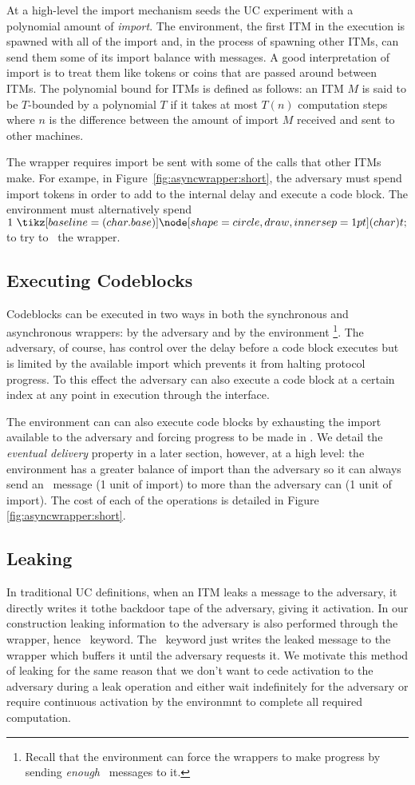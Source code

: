 At a high-level the import mechanism seeds the UC experiment with a polynomial amount of \textit{import}.
The environment, the first ITM in the execution is spawned with all of the import and, in the process of spawning other ITMs, can send them some of its import balance with messages.
A good interpretation of import is to treat them like tokens or coins that are passed around between ITMs.
The polynomial bound for ITMs is defined as follows: an ITM $M$ is said to be $T$-bounded by a polynomial $T$ if it takes at most $T(n)$ computation steps where $n$ is the difference between the amount of import $M$ received and sent to other machines.

The wrapper requires import be sent with some of the calls that other ITMs make. 
For exampe, in Figure~\ref{fig:asyncwrapper:short}, the adversary must spend import tokens in order to add to the internal delay and execute a code block.
The environment must alternatively spend $1 \token$ to try to \Advance~the wrapper.

\subsection{Executing Codeblocks}
Codeblocks can be executed in two ways in both the synchronous and asynchronous wrappers: by the adversary and by the environment \footnote{Recall that the environment can force the wrappers to make progress by sending {\em enough} \Advance~messages to it.}.
The adversary, of course, has control over the delay before a code block executes but is limited by the available import which prevents it from halting protocol progress.
To this effect the adversary can also execute a code block at a certain index at any point in execution through the \Exec interface.

The environment can can also execute code blocks by exhausting the import available to the adversary and forcing progress to be made in \Wasync.
We detail the {\em eventual delivery} property in a later section, however, at a high level: the environment has a greater balance of import than the adversary so it can always send an \Advance~message (1 unit of import) to \Wasync more than the adversary can \Delay (1 unit of import).
The cost of each of the operations is detailed in Figure \ref{fig:asyncwrapper:short}.

\subsection{Leaking}
In traditional UC definitions, when an ITM leaks a message to the adversary, it directly writes it tothe backdoor tape of the adversary, giving it activation.
In our construction leaking information to the adversary is also performed through the wrapper, hence \Leak~keyword.
The \Leak~keyword just writes the leaked message to the wrapper which buffers it until the adversary requests it.
We motivate this method of leaking for the same reason that we don't want to cede activation to the adversary during a leak operation and either wait indefinitely for the adversary or require continuous activation by the environmnt to complete all required computation.

